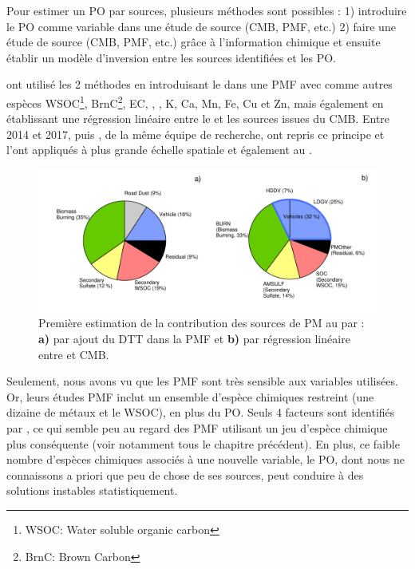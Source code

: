 Pour estimer un PO par sources, plusieurs méthodes sont possibles : 1) introduire le PO
comme variable dans une étude de source (CMB, PMF, etc.) 2) faire une étude de source
(CMB, PMF, etc.) grâce à l'information chimique et ensuite établir un modèle d'inversion
entre les sources identifiées et les PO.

\cite{vermaReactive2014} ont utilisé les 2 méthodes en introduisant le
\PODTT{} dans une PMF avec comme autres espèces WSOC\footnote{WSOC: Water soluble
organic carbon}, BrnC\footnote{BrnC: Brown Carbon}, EC, \SOq, \NHt, K, Ca, Mn, Fe, Cu et
Zn, mais également en établissant une régression linéaire entre le \PODTT{} et les sources
issues du CMB.
Entre 2014 et 2017, \cite{batesReactive2015} puis \cite{fangOxidative2016}, de la même
équipe de recherche, ont repris ce principe et l'ont appliqués à plus grande échelle
spatiale et également au \POAAv.

\begin{figure}[ht]
    \centering
    \includegraphics[width=1.0\linewidth]{figures/chapter04/verma_2014_fig8.pdf}
    \caption{Première estimation de la contribution des sources de PM au \PODTT{} par
        \cite[][figure 8]{vermaReactive2014}: \textbf{a)} par ajout du DTT dans la PMF et
        \textbf{b)} par régression linéaire entre \PODTT{} et CMB.
    }%
    \label{fig:figures/chapter04/verma_2014_fig8}
\end{figure}

Seulement, nous avons vu que les PMF sont très sensible aux variables utilisées. Or, leurs
études PMF inclut un ensemble d'espèce chimiques restreint (une dizaine de métaux et le
WSOC), en plus du PO. Seuls 4 facteurs sont identifiés par \cite{fangOxidative2016}, ce
qui semble peu au regard des PMF utilisant un jeu d'espèce chimique plus conséquente (voir
notamment tous le chapitre précédent). En plus, ce faible nombre d'espèces chimiques
associés à une nouvelle variable, le PO, dont nous ne connaissons a priori que peu de chose de ses
sources, peut conduire à des solutions instables statistiquement.

